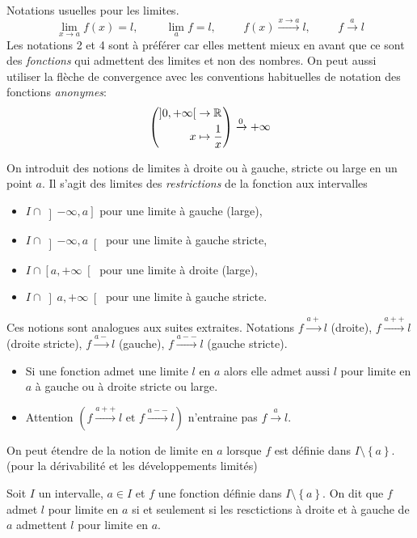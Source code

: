 Notations usuelles pour les limites.
\begin{displaymath}
  \lim_{x\rightarrow a}f(x) = l,\hspace{1cm} \lim_{a}f = l,\hspace{1cm}
  f(x)\xrightarrow{x \rightarrow a}l, \hspace{1cm} f \xrightarrow{a}l 
\end{displaymath}
Les notations 2 et 4 sont à préférer car elles mettent mieux en avant que ce sont des \emph{fonctions} qui admettent des limites et non des nombres. On peut aussi utiliser la flèche de convergence  avec les conventions habituelles de notation des fonctions \emph{anonymes}:
\begin{displaymath}
\left(
\begin{aligned}
  \left]0,+\infty \right[ &\rightarrow \mathbb{R} \\ x&\mapsto \frac{1}{x} 
\end{aligned} 
\right) \xrightarrow{0} +\infty
\end{displaymath}

On introduit des notions de limites à droite ou à gauche, stricte ou large en un point $a$. Il s'agit des limites des \emph{restrictions} de la fonction aux intervalles
\begin{itemize}
 \item $I\cap \left] -\infty , a \right]$ pour une limite à gauche (large),
 \item $I\cap \left] -\infty , a \right[$ pour une limite à gauche stricte,
 \item $I\cap \left[ a, +\infty \right[$ pour une limite à droite (large),
 \item $I\cap \left] a, +\infty \right[$ pour une limite à gauche stricte.
\end{itemize}
Ces notions sont analogues aux suites extraites. Notations $f\xrightarrow{a+}l$ (droite), $f\xrightarrow{a++}l$ (droite stricte), $f\xrightarrow{a-}l$ (gauche), $f\xrightarrow{a--}l$ (gauche stricte). 
\begin{rems}
\begin{itemize}
 \item Si une fonction admet une limite $l$ en $a$ alors elle admet aussi $l$ pour limite en $a$ à gauche ou à droite stricte ou large.
 \item Attention  $\left( f\xrightarrow{a++}l \text{ et } f\xrightarrow{a--}l\right) $ n'entraine pas  $f\xrightarrow{a}l$.
\end{itemize}
\end{rems}
On peut étendre de la notion de limite en $a$ lorsque $f$ est définie dans $I\setminus\left\lbrace a\right\rbrace$. (pour la dérivabilité et les développements limités)
\begin{defi}
 Soit $I$ un intervalle, $a\in I$ et $f$ une fonction définie dans $I\setminus\left\lbrace a\right\rbrace$. On dit que $f$ admet $l$ pour limite en $a$ si et seulement si les resctictions à droite et à gauche de $a$ admettent $l$ pour limite en $a$. 
\end{defi}

